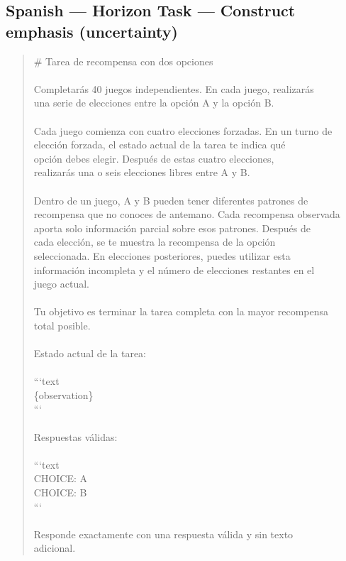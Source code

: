\documentclass[logo,msc,inf]{infthesis}       %
\begin{document}
\subsection*{Spanish --- Horizon Task --- Construct emphasis (uncertainty)}
\begin{quote}\ttfamily\footnotesize
\# Tarea de recompensa con dos opciones \\
\\
Completarás 40 juegos independientes. En cada juego, realizarás \\
una serie de elecciones entre la opción A y la opción B. \\
\\
Cada juego comienza con cuatro elecciones forzadas. En un turno de \\
elección forzada, el estado actual de la tarea te indica qué \\
opción debes elegir. Después de estas cuatro elecciones, \\
realizarás una o seis elecciones libres entre A y B. \\
\\
Dentro de un juego, A y B pueden tener diferentes patrones de \\
recompensa que no conoces de antemano. Cada recompensa observada \\
aporta solo información parcial sobre esos patrones. Después de \\
cada elección, se te muestra la recompensa de la opción \\
seleccionada. En elecciones posteriores, puedes utilizar esta \\
información incompleta y el número de elecciones restantes en el \\
juego actual. \\
\\
Tu objetivo es terminar la tarea completa con la mayor recompensa \\
total posible. \\
\\
Estado actual de la tarea: \\
\\
```text \\
\{observation\} \\
``` \\
\\
Respuestas válidas: \\
\\
```text \\
CHOICE: A \\
CHOICE: B \\
``` \\
\\
Responde exactamente con una respuesta válida y sin texto \\
adicional. \\
\end{quote}
\end{document}
